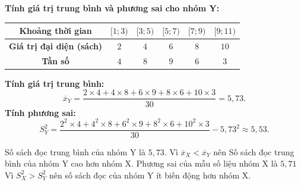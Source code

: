 \begin{ex}[Mức độ 3]
{\textbf{Tính giá trị trung bình và phương sai cho nhóm Y:}
\begin{center}
\begin{tabular}{|c|c|c|c|c|c|}
\hline \textbf{Khoảng thời gian} & $[1; 3)$ & $[3; 5)$ & $[5; 7)$ & $[7; 9)$ & $[9; 11)$ \\
\hline \textbf{Giá trị đại diện (sách)} & $2$ & $4$ & $6$ & $8$ & $10$ \\
\hline \textbf{Tần số} & $4$ & $8$ & $9$ & $6$ & $3$ \\
\hline
\end{tabular}
\end{center}
\textbf{Tính giá trị trung bình:}
$$\overline{x}_Y = \frac{2 \times 4 + 4 \times 8 + 6 \times 9 + 8 \times 6 + 10 \times 3}{30} = 5{,}73.$$
\textbf{Tính phương sai:}
$$S^2_Y = \frac{2^2 \times 4 + 4^2 \times 8 + 6^2 \times 9 + 8^2 \times 6 + 10^2 \times 3}{30} - 5{,}73^2 \approx 5{,}53.$$
\begin{itemchoice}
\itemch Số sách đọc trung bình của nhóm Y là $5{,}73$.
\itemch Vì $\overline{x}_X<\overline{x}_Y$ nên Số sách đọc trung bình của nhóm Y cao hơn nhóm X.
\itemch Phương sai của mẫu số liệu nhóm X là $5{,}71$
\itemch Vì $S^2_X>S^2_Y$ nên số sách đọc của nhóm Y ít biến động hơn nhóm X.
\end{itemchoice}
}
\end{ex}

